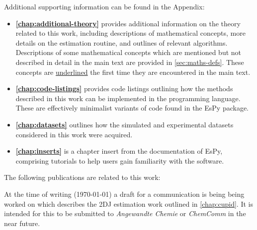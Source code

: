 Additional supporting information can be found in the Appendix:
\begin{itemize}[label={},leftmargin=*]
    \item \textbf{\cref{chap:additional-theory}} provides additional
        information on the theory related to this work, including descriptions
        of mathematical concepts, more details on the estimation
        routine, and outlines of relevant algorithms. Descriptions of some
        mathematical concepts which are mentioned but not described in detail
        in the main text are provided in \cref{sec:maths-defs}. These
        concepts are \underline{underlined} the first time they are encountered
        in the main text.
    \item \textbf{\cref{chap:code-listings}} provides code listings outlining
        how the methods described in this work can be implemented in the
        \Python programming language.
        These are effectively minimalist variants of code found in the
        \ac{EsPy} package.
    \item \textbf{\cref{chap:datasets}} outlines how the simulated and
        experimental datasets considered in this work were acquired.
    \item \textbf{\cref{chap:inserts}} is a chapter insert from the
        documentation of \ac{EsPy}, comprising tutorials to help users gain
        familiarity with the software.
\end{itemize}

The following publications are related to this work:


At the time of writing (\today) a draft for a communication is being being
worked on which describes the \ac{2DJ} estimation work outlined in
\cref{chap:cupid}. It is intended for this to be submitted to
\textit{Angewandte Chemie} or \textit{ChemComm} in the near future.
